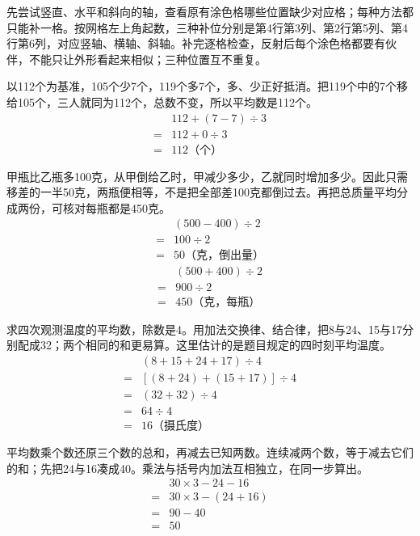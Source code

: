 \documentclass[multi=snippet,border=0pt]{standalone}
\newenvironment{snippet}[3]{\begin{minipage}{#1bp}\color{answerred}\fontsize{#2}{#3}\selectfont\raggedright}{\end{minipage}}
\begin{document}
\begin{snippet}{505}{11.5}{14}先尝试竖直、水平和斜向的轴，查看原有涂色格哪些位置缺少对应格；每种方法都只能补一格。按网格左上角起数，三种补位分别是第4行第3列、第2行第5列、第4行第6列，对应竖轴、横轴、斜轴。补完逐格检查，反射后每个涂色格都要有伙伴，不能只让外形看起来相似；三种位置互不重复。\end{snippet}
\begin{snippet}{505}{11.5}{14}以112个为基准，105个少7个，119个多7个，多、少正好抵消。把119个中的7个移给105个，三人就同为112个，总数不变，所以平均数是112个。\[\begin{aligned}&112+(7-7)\div3\\={}&112+0\div3\\={}&112\text{（个）}\end{aligned}\]\end{snippet}
\begin{snippet}{505}{11.5}{14}甲瓶比乙瓶多100克，从甲倒给乙时，甲减少多少，乙就同时增加多少。因此只需移差的一半50克，两瓶便相等，不是把全部差100克都倒过去。再把总质量平均分成两份，可核对每瓶都是450克。\[\begin{aligned}&(500-400)\div2\\={}&100\div2\\={}&50\text{（克，倒出量）}\end{aligned}\]\[\begin{aligned}&(500+400)\div2\\={}&900\div2\\={}&450\text{（克，每瓶）}\end{aligned}\]\end{snippet}
\begin{snippet}{505}{11.5}{14}求四次观测温度的平均数，除数是4。用加法交换律、结合律，把8与24、15与17分别配成32；两个相同的和更易算。这里估计的是题目规定的四时刻平均温度。\[\begin{aligned}&(8+15+24+17)\div4\\={}&[(8+24)+(15+17)]\div4\\={}&(32+32)\div4\\={}&64\div4\\={}&16\text{（摄氏度）}\end{aligned}\]\end{snippet}
\begin{snippet}{505}{11.5}{14}平均数乘个数还原三个数的总和，再减去已知两数。连续减两个数，等于减去它们的和；先把24与16凑成40。乘法与括号内加法互相独立，在同一步算出。\[\begin{aligned}&30\times3-24-16\\={}&30\times3-(24+16)\\={}&90-40\\={}&50\end{aligned}\]\end{snippet}
\end{document}
